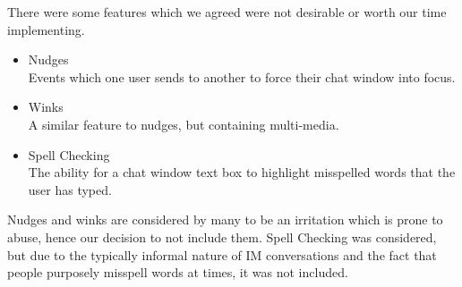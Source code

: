 There were some features which we agreed were not desirable or worth our time implementing.

\begin{itemize}

\item{Nudges\\
	Events which one user sends to another to force their chat window into focus.}
\item{Winks\\
	A similar feature to nudges, but containing multi-media.}
\item{Spell Checking\\
	The ability for a chat window text box to highlight misspelled words that the user has typed.}

\end{itemize}

Nudges and winks are considered by many to be an irritation which is prone to abuse, hence our decision to not include them. Spell Checking was considered, but due to the typically informal nature of IM conversations and the fact that people purposely misspell words at times, it was not included.

